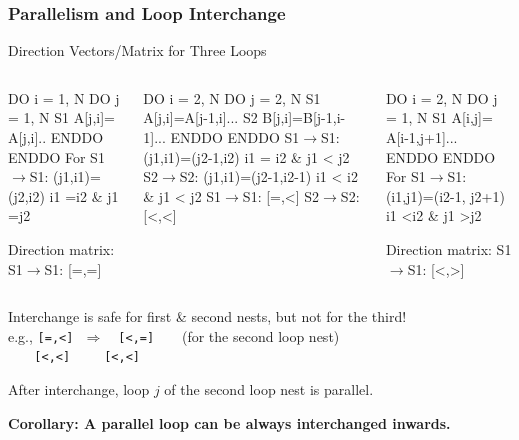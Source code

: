\documentclass[rgb,dvipsnames]{beamer}
\renewcommand{\emph}[1]{\textcolor{structure}{#1}}
\newcommand{\emp}[1]{\textcolor{DikuRed}{ #1}}
\newcommand{\mymath}[1]{$ #1 $}
\begin{document}
\begin{frame}[fragile,t]
  \frametitle{Parallelism and Loop Interchange} 

\begin{block}{Direction Vectors/Matrix for Three Loops }
\begin{columns}
\begin{colorcode}
  DO i = 1, N
    DO j = 1, N
S1    A[j,i]=
       A[j,i]..
    ENDDO
  ENDDO
For S1\mymath{\rightarrow}S1: 
 (j1,i1)=(j2,i2) 
 i1\emp{=}i2 \& j1\emp{=}j2

Direction matrix:
S1\mymath{\rightarrow}S1: \emp{[=,=]}
\end{colorcode}
\begin{colorcode}
  DO i = 2, N
   DO j = 2, N
S1  A[j,i]=A[j-1,i]...
S2  B[j,i]=B[j-1,i-1]...
   ENDDO
  ENDDO
S1\mymath{\rightarrow}S1: (j1,i1)=(j2-1,i2)
        i1 \emp{=} i2 \& j1 \emp{<} j2
S2\mymath{\rightarrow}S2: (j1,i1)=(j2-1,i2-1)
        i1 \emp{<} i2 \& j1 \emp{<} j2
S1\mymath{\rightarrow}S1: \emp{[=,<]}
S2\mymath{\rightarrow}S2: \emp{[<,<]}
\end{colorcode}
\begin{colorcode}
  DO i = 2, N
   DO j = 1, N
S1  A[i,j]=
     A[i-1,j+1]...
   ENDDO
  ENDDO
For S1\mymath{\rightarrow}S1:
 (i1,j1)=(i2-1,
          j2+1)
 i1\emp{<}i2 \& j1\emp{>}j2

Direction matrix:
S1\mymath{\rightarrow}S1: \emp{[<,>]}
\end{colorcode}
\end{columns}
\end{block} 


Interchange is safe for first \& second nests, but not for the third!\\
e.g., \emp{\tt [=,<]}$~~~\Rightarrow~~~$ \emph{\tt [<,=]}$~~~~~~~~~$(for the second loop nest)\\
$~~~~~~~$\emp{\tt [<,<]}$~~~~~~~~~~~$\emph{\tt [<,<]}

\pause\smallskip

After interchange, loop $j$ of the second loop nest is parallel.

\bigskip

\emph{\bf Corollary: A parallel loop can be always interchanged inwards.}
\end{frame}
\end{document}
